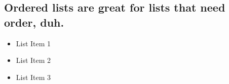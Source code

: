 \documentclass{juwit}
\begin{document}
  \subsection*{ Ordered lists are great for lists that need order, duh. }

  \begin{itemize}                \item List Item 1             \item List Item 2             \item List Item 3          \end{itemize}
\end{document}
